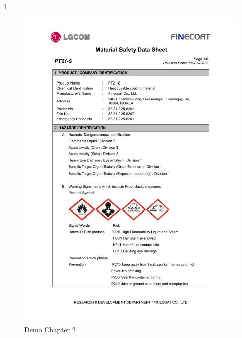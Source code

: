 l\documentclass[a4paper,12pt,twoside]{report}
\begin{document}
\begin{figure}[H]
		\includegraphics[width=\textwidth, keepaspectratio]{images/chaps1}
	\caption[Demo Chapter 2 ]{Demo Chapter 2}
\label{chaps1}
\end{figure}
\end{document}
